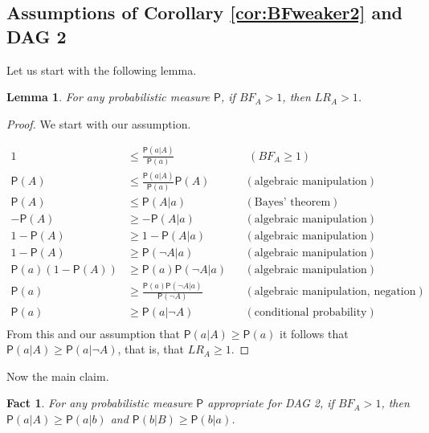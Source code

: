 \documentclass[
  10pt,
  dvipsnames,enabledeprecatedfontcommands]{scrartcl}
\newtheorem{fact}{Fact}
\newcommand{\n}{\neg}
\newcommand{\pr}[1]{\ensuremath{\mathsf{P}(#1)}}
\newtheorem{lemma}{Lemma}
\begin{document}
\hypertarget{assumptions-of-corollary-and}{%
\subsection*{\texorpdfstring{Assumptions of Corollary
\ref{cor:BFweaker2} and
\textsf{DAG 2}}{Assumptions of Corollary  and }}\label{assumptions-of-corollary-and}}

Let us start with the following lemma.

\begin{lemma} For any probabilistic measure $\mathsf{P}$, if $BF_A >1$, then $LR_A>1$.\label{lem:BFLR}
\end{lemma}

\begin{proof} We start with our assumption.


\begin{align*}
1 & \leq \frac{\pr{a \vert A}}{\pr{a}} & &  \,\, (BF_A \geq 1) \\
\pr{A} & \leq  \frac{\pr{a \vert A}}{\pr{a}} \pr{A} & & (\mbox{algebraic manipulation}) \\
\pr{A} & \leq \pr{A \vert a} & &  (\mbox{Bayes' theorem})  \\
- \pr{A} &\geq - \pr{A \vert a} &  &   (\mbox{algebraic manipulation}) \\
1- \pr{A} & \geq 1 - \pr{A \vert a} & & (\mbox{algebraic manipulation})\\
1- \pr{A}  & \geq \pr{\n A \vert a} & & (\mbox{algebraic manipulation})\\
\pr{a}\left( 1 - \pr{A}\right) & \geq \pr{a}\pr{\n A \vert a}  & & (\mbox{algebraic manipulation})\\
\pr{a} & \geq \frac{\pr{a} \pr{\n A \vert a}}{\pr{\n A}} &  & (\mbox{algebraic manipulation, negation}) \\
\pr{a} & \geq \pr{a \vert \n A}  & &   (\mbox{conditional probability}) \\
\end{align*}
From this and our assumption  that $\pr{a \vert A} \geq \pr{a}$ it follows that $\pr{a \vert A}\geq \pr{a \vert \n A}$, that is, that \mbox{$LR_A \geq 1$}.
\end{proof}

Now the main claim.

\begin{fact}
For any probabilistic measure $\mathsf{P}$ appropriate for \textsf{DAG 2}, if $BF_A >1$, then $\pr{a \vert A} \geq \pr{a \vert b}$ and 
$\pr{b \vert B} \geq \pr{b \vert a}$.
\end{fact}
\end{document}
